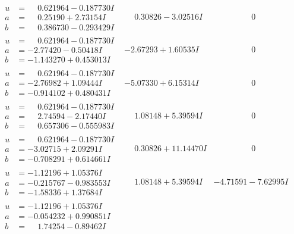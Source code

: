 \documentclass[1p]{elsarticle_modified}
\theoremstyle{definition}
\begin{document}
$$\begin{array}{c|c|c}
\begin{aligned}
u &= \phantom{-}0.621964 - 0.187730 I \\
a &= \phantom{-}0.25190 + 2.73154 I \\
b &= \phantom{-}0.386730 - 0.293429 I\end{aligned}
 & \phantom{-}0.30826 - 3.02516 I & \phantom{-0.000000 } 0 \\ \hline\begin{aligned}
u &= \phantom{-}0.621964 - 0.187730 I \\
a &= -2.77420 - 0.50418 I \\
b &= -1.143270 + 0.453013 I\end{aligned}
 & -2.67293 + 1.60535 I & \phantom{-0.000000 } 0 \\ \hline\begin{aligned}
u &= \phantom{-}0.621964 - 0.187730 I \\
a &= -2.76982 + 1.09444 I \\
b &= -0.914102 + 0.480431 I\end{aligned}
 & -5.07330 + 6.15314 I & \phantom{-0.000000 } 0 \\ \hline\begin{aligned}
u &= \phantom{-}0.621964 - 0.187730 I \\
a &= \phantom{-}2.74594 - 2.17440 I \\
b &= \phantom{-}0.657306 - 0.555983 I\end{aligned}
 & \phantom{-}1.08148 + 5.39594 I & \phantom{-0.000000 } 0 \\ \hline\begin{aligned}
u &= \phantom{-}0.621964 - 0.187730 I \\
a &= -3.02715 + 2.09291 I \\
b &= -0.708291 + 0.614661 I\end{aligned}
 & \phantom{-}0.30826 + 11.14470 I & \phantom{-0.000000 } 0 \\ \hline\begin{aligned}
u &= -1.12196 + 1.05376 I \\
a &= -0.215767 - 0.983553 I \\
b &= -1.58336 + 1.37684 I\end{aligned}
 & \phantom{-}1.08148 + 5.39594 I & -4.71591 - 7.62995 I \\ \hline\begin{aligned}
u &= -1.12196 + 1.05376 I \\
a &= -0.054232 + 0.990851 I \\
b &= \phantom{-}1.74254 - 0.89462 I\end{aligned}

\end{array}$$
\end{document}
